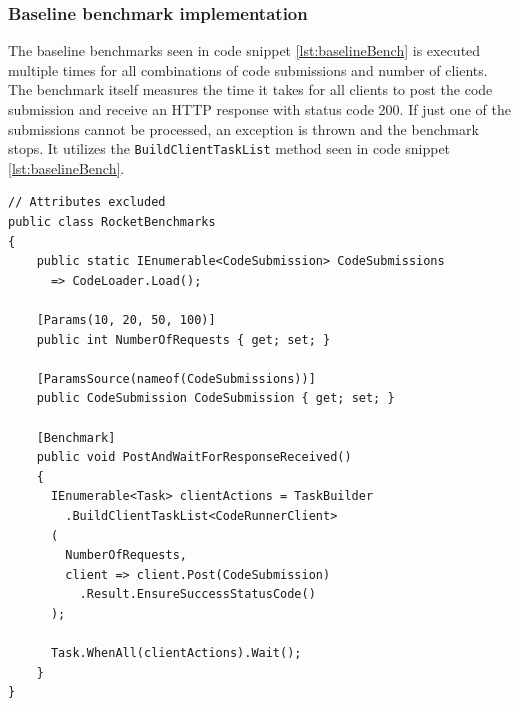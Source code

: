 \subsubsection{Baseline benchmark implementation}
The baseline benchmarks seen in code snippet \ref{lst:baselineBench} is executed multiple times for all combinations of code submissions and number of clients.
The benchmark itself measures the time it takes for all clients to post the code submission and receive an HTTP response with status code 200.
If just one of the submissions cannot be processed, an exception is thrown and the benchmark stops.
It utilizes the \texttt{BuildClientTaskList} method seen in code snippet \ref{lst:baselineBench}.
\begin{lstlisting}[language=CSharp, escapechar=~, caption={C\# code showing the benchmark implementation for the synchronous baseline}, label={lst:baselineBench}]
// Attributes excluded
public class RocketBenchmarks
{
    public static IEnumerable<CodeSubmission> CodeSubmissions
      => CodeLoader.Load();

    [Params(10, 20, 50, 100)]
    public int NumberOfRequests { get; set; }

    [ParamsSource(nameof(CodeSubmissions))]
    public CodeSubmission CodeSubmission { get; set; }

    [Benchmark]
    public void PostAndWaitForResponseReceived()
    {
      IEnumerable<Task> clientActions = TaskBuilder
        .BuildClientTaskList<CodeRunnerClient>
      (
        NumberOfRequests,
        client => client.Post(CodeSubmission)
          .Result.EnsureSuccessStatusCode()
      );

      Task.WhenAll(clientActions).Wait();
    }
}
\end{lstlisting}


